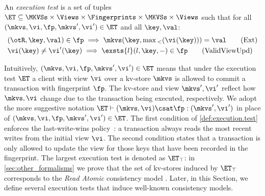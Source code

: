 
\begin{definition}
\label{def:execution.test}
An \emph{execution test} is a set of tuples $\ET \subseteq \MKVSs \times \Views \times \Fingerprints \times \MKVSs \times \Views$ 
such that for all $(\mkvs, \vi, \fp, \mkvs', \vi') \in \ET$ and all $\key, \val$:
%
{%
\begin{align}
\small
    & 
	(\otR, \key, \val) \in \fp \implies
	\mkvs(\key, \max{}_{<}(\vi(\key))) = \val  
	\tag{Ext} \label{eq:read-external} \\
    & 
    \vi(\key) \neq \vi'(\key) 
    \implies
    \exsts{l} (l, \key, -) \in \fp
    \tag{ValidViewUpd} \label{eq:valid-view-update}
\end{align}%
}%
\end{definition}
%
\noindent 
Intuitively, $(\mkvs, \vi, \fp, \mkvs', \vi') \in \ET$ means that under the execution test $\ET$ 
a client with view $\vi$ over a kv-store $\mkvs$ is allowed to commit a transaction with 
fingerprint $\fp$. The kv-store and view $\mkvs', \vi'$ reflect how $\mkvs, \vi$ change due 
to the transaction being executed, respectively. We adopt the more suggestive notation 
$\ET \vdash (\mkvs, \vi) \csat \fp: (\mkvs', \vi')$ in place of $(\mkvs, \vi, \fp, \mkvs', \vi') \in \ET$.
The first condition of \cref{def:execution.test} enforces the last-write-wins policy~\cite{vogels:2009:ec:1435417.1435432}: 
a transaction always reads the most recent writes from the initial view \(\vi\).  
The second condition states that a transaction is only allowed to update the view for those keys 
that have been recorded in the fingerprint.  The largest execution test is denoted as $\ET_{\top}$: 
in \cref{sec:other_formalisms} we prove that the set of kv-stores induced by $\ET_{\top}$ 
corresponds to the \emph{Read Atomic} consistency model \cite{ramp}. Later, in this Section, 
we define several execution tests that induce well-known consistency models.


